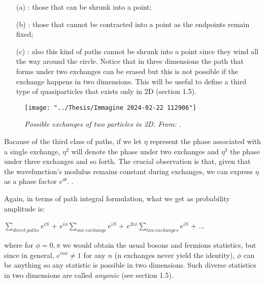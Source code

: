\documentclass{Configuration_Files/PoliMi3i_thesis}
\begin{document}
\begin{enumerate}
	\item[(a)] : those that can be shrunk into a point;

	\item[(b)] : those that cannot be contracted into a point as the endpoints remain fixed;

	\item[(c)] : also this kind of paths cannot be shrunk into a point since they wind all  the way around the circle. Notice that in three dimensions the path that forms under two exchanges can be erased but this is not possible if the exchange happens in two dimensions. This will be useful to define a third type of quasiparticles that exists only in 2D (section 1.5).
\end{enumerate}

\begin{figure}[H]
	\centering
	\texttt{[image: "../Thesis/Immagine 2024-02-22 112906"]}
	\caption{ \textit{ Possible exchanges of two particles in 2D. From: \cite{Rao16}.}}
	\label{fig:immagine-2024-02-22-112906}
\end{figure}

Bacause of the third class of paths, { if we let $\eta$ represent the phase associated with a single exchange, $\eta^2$ will denote the phase under two exchanges and $\eta^3$ the phase under three exchanges and so forth. The crucial observation is that, given that the wavefunction's modulus remains constant during exchanges, we can express $\eta$ as a phase factor $e^{i\theta}$. \cite{Rao16}}. \newline

Again, in terms of path integral formulation, what we get as probability amplitude is:

\begin{center}
	$\sum_{direct \ paths} e^{iS}$ + $e^{i \phi} \sum_{ one \ exchange} e^{iS}$  + $e^{2i \phi} \sum_{ two \ exchanges} e^{iS}$  + ...
\end{center}

where for $ \phi = 0, \pi$ we would obtain the usual bosons and fermions statistics, but since in general, $e^{in\phi} \neq 1$ for any $n$ (n exchanges never yield the identity), $\phi$ can be anything so any statistic is possible in two dimensions.
Such diverse statistics in two dimensions are called \textit{anyonic} (see section 1.5).\newline
\end{document}
